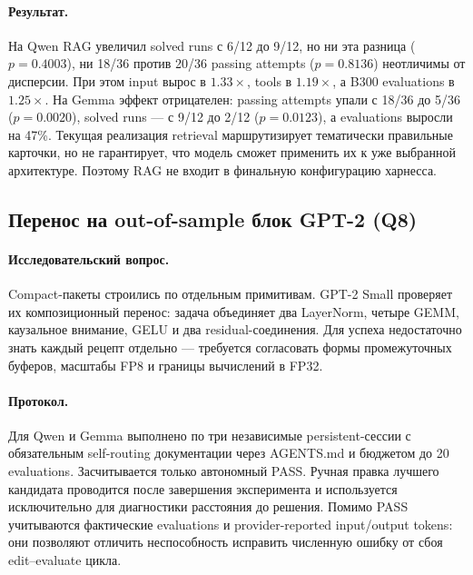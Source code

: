 \documentclass[10pt,a4paper]{article}
\begin{document}
\paragraph{Результат.}
На Qwen RAG увеличил solved runs с 6/12 до 9/12, но ни эта разница
($p=0.4003$), ни 18/36 против 20/36 passing attempts ($p=0.8136$) неотличимы
от дисперсии. При этом input вырос в $1.33\times$, tools в $1.19\times$, а
B300 evaluations в $1.25\times$. На Gemma эффект отрицателен: passing attempts
упали с 18/36 до 5/36 ($p=0.0020$), solved runs --- с 9/12 до 2/12
($p=0.0123$), а evaluations выросли на 47\%. Текущая реализация retrieval
маршрутизирует тематически правильные карточки, но не гарантирует, что модель
сможет применить их к уже выбранной архитектуре. Поэтому RAG не входит в
финальную конфигурацию харнесса.

\subsection{Перенос на out-of-sample блок GPT-2 (Q8)}

\paragraph{Исследовательский вопрос.}
Compact-пакеты строились по отдельным примитивам. GPT-2 Small проверяет их
композиционный перенос: задача объединяет два LayerNorm, четыре GEMM,
каузальное внимание, GELU и два residual-соединения. Для успеха недостаточно
знать каждый рецепт отдельно --- требуется согласовать формы промежуточных
буферов, масштабы FP8 и границы вычислений в FP32.

\paragraph{Протокол.}
Для Qwen и Gemma выполнено по три независимые persistent-сессии с обязательным
self-routing документации через AGENTS.md и бюджетом до 20 evaluations.
Засчитывается только автономный PASS. Ручная правка лучшего кандидата проводится
после завершения эксперимента и используется исключительно для диагностики
расстояния до решения. Помимо PASS учитываются фактические evaluations и
provider-reported input/output tokens: они позволяют отличить неспособность
исправить численную ошибку от сбоя edit--evaluate цикла.
\end{document}
